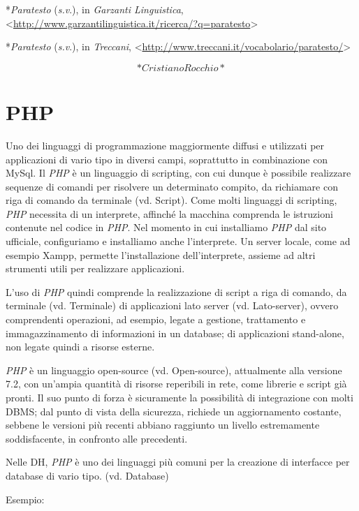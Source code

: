\documentclass[
  b5paper,
  twoside,
  11pt,
  chapterprefix=false,
  bibliography=totocnumbered,
  parskip=0]{scrbook}
\begin{document}
*\emph{Paratesto} (\emph{s.v}.), in \emph{Garzanti Linguistica},
\textless{}{\url{http://www.garzantilinguistica.it/ricerca/?q=paratesto}\textgreater{}}

*\emph{Paratesto} (\emph{s.v}.), in \emph{Treccani},
\textless{}\href{http://www.treccani.it/vocabolario/paratesto/}{{http://www.treccani.it/vocabolario/paratesto/}}\textgreater{}

\[*Cristiano Rocchio*\]

\hypertarget{php}{%
\chapter{PHP}\label{php}}

Uno dei linguaggi di programmazione maggiormente diffusi e utilizzati
per applicazioni di vario tipo in diversi campi, soprattutto in
combinazione con MySql. Il \emph{PHP} è un linguaggio di scripting, con cui
dunque è possibile realizzare sequenze di comandi per risolvere un
determinato compito, da richiamare con riga di comando da terminale (vd.
Script). Come molti linguaggi di scripting, \emph{PHP} necessita di un
interprete, affinché la macchina comprenda le istruzioni contenute nel
codice in \emph{PHP}. Nel momento in cui installiamo \emph{PHP} dal sito
ufficiale, configuriamo e installiamo anche l'interprete. Un server
locale, come ad esempio Xampp, permette l'installazione dell'interprete,
assieme ad altri strumenti utili per realizzare applicazioni.

L'uso di \emph{PHP} quindi comprende la realizzazione di script a riga di
comando, da terminale (vd. Terminale) di applicazioni lato server (vd.
Lato-server), ovvero comprendenti operazioni, ad esempio, legate a
gestione, trattamento e immagazzinamento di informazioni in un database;
di applicazioni stand-alone, non legate quindi a risorse esterne.

\emph{PHP} è un linguaggio open-source (vd. Open-source), attualmente alla
versione 7.2, con un'ampia quantità di risorse reperibili in rete, come
librerie e script già pronti. Il suo punto di forza è sicuramente la
possibilità di integrazione con molti DBMS; dal punto di vista della
sicurezza, richiede un aggiornamento costante, sebbene le versioni più
recenti abbiano raggiunto un livello estremamente soddisfacente, in
confronto alle precedenti.

Nelle DH, \emph{PHP} è uno dei linguaggi più comuni per la creazione di
interfacce per database di vario tipo. (vd. Database)

Esempio:
\end{document}
